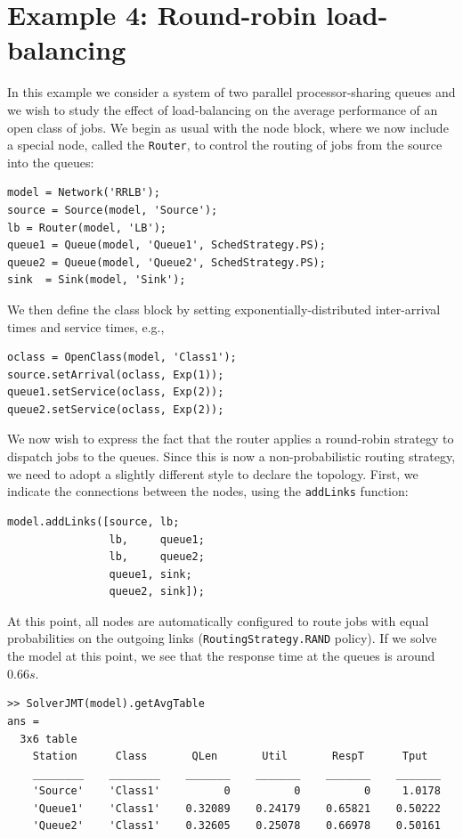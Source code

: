 \section{Example 4: Round-robin load-balancing}
\label{example-4-round-robin-load-balancing}
In this example we consider a system of two parallel processor-sharing queues and we wish to study the effect of load-balancing on the average performance of an open class of jobs. We begin as usual with the node block, where we now include a special node, called the \texttt{Router}, to control the routing of jobs from the source into the queues:
\begin{lstlisting}
model = Network('RRLB');
source = Source(model, 'Source');
lb = Router(model, 'LB');
queue1 = Queue(model, 'Queue1', SchedStrategy.PS);
queue2 = Queue(model, 'Queue2', SchedStrategy.PS);
sink  = Sink(model, 'Sink');
\end{lstlisting}
We then define the class block by setting exponentially-distributed inter-arrival times and service times, e.g.,
\begin{lstlisting}
oclass = OpenClass(model, 'Class1');
source.setArrival(oclass, Exp(1));
queue1.setService(oclass, Exp(2));
queue2.setService(oclass, Exp(2));
\end{lstlisting}
We now wish to express the fact that the router applies a round-robin strategy to dispatch jobs to the queues. Since this is now a non-probabilistic routing strategy, we need to adopt a slightly different style to declare the topology. First, we indicate the connections between the nodes, using the \texttt{addLinks} function:
\begin{lstlisting}
model.addLinks([source, lb;
                lb,     queue1;
                lb,     queue2;
                queue1, sink;
                queue2, sink]);
\end{lstlisting}
At this point, all nodes are automatically configured to route jobs with equal probabilities on the outgoing links (\texttt{RoutingStrategy.RAND} policy). If we solve the model at this point, we see that the response time at the queues is around $0.66 s$.
\begin{lstlisting}
>> SolverJMT(model).getAvgTable
ans =
  3x6 table
    Station      Class       QLen       Util       RespT      Tput
    ________    ________    _______    _______    _______    _______
    'Source'    'Class1'          0          0          0     1.0178
    'Queue1'    'Class1'    0.32089    0.24179    0.65821    0.50222
    'Queue2'    'Class1'    0.32605    0.25078    0.66978    0.50161
\end{lstlisting}

